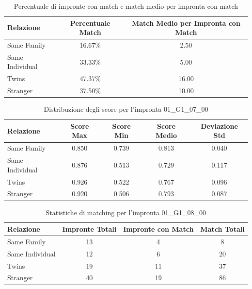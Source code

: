 \begin{table}[htbp]
\centering
\caption{Percentuale di impronte con match e match medio per impronta con match}
\label{tab:match_percentage_01_G1_07_00}
\begin{tabular}{|l|c|c|}
\hline
\textbf{Relazione} & \textbf{Percentuale Match} & \textbf{Match Medio per Impronta con Match} \\
\hline
Same Family & 16.67\% & 2.50 \\
\hline
Same Individual & 33.33\% & 5.00 \\
\hline
Twins & 47.37\% & 16.00 \\
\hline
Stranger & 37.50\% & 10.00 \\
\hline
\end{tabular}
\end{table}


\begin{table}[htbp]
\centering
\caption{Distribuzione degli score per l'impronta 01\_G1\_07\_00}
\label{tab:scores_01_G1_07_00}
\begin{tabular}{|l|c|c|c|c|}
\hline
\textbf{Relazione} & \textbf{Score Max} & \textbf{Score Min} & \textbf{Score Medio} & \textbf{Deviazione Std} \\
\hline
Same Family & 0.850 & 0.739 & 0.813 & 0.040 \\
\hline
Same Individual & 0.876 & 0.513 & 0.729 & 0.117 \\
\hline
Twins & 0.926 & 0.522 & 0.767 & 0.096 \\
\hline
Stranger & 0.920 & 0.506 & 0.793 & 0.087 \\
\hline
\end{tabular}
\end{table}


\begin{table}[htbp]
\centering
\caption{Statistiche di matching per l'impronta 01\_G1\_08\_00}
\label{tab:results_01_G1_08_00}
\begin{tabular}{|l|c|c|c|}
\hline
\textbf{Relazione} & \textbf{Impronte Totali} & \textbf{Impronte con Match} & \textbf{Match Totali} \\
\hline
Same Family & 13 & 4 & 8 \\
\hline
Same Individual & 12 & 6 & 20 \\
\hline
Twins & 19 & 11 & 37 \\
\hline
Stranger & 40 & 19 & 86 \\
\hline
\end{tabular}
\end{table}


